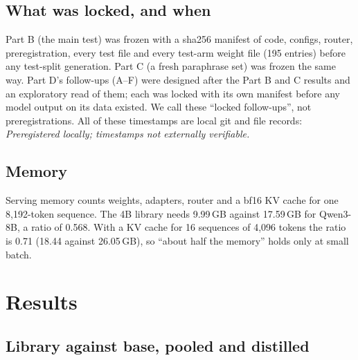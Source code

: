 \documentclass[11pt]{article}
\begin{document}
\subsection{What was locked, and when}
Part B (the main test) was frozen with a sha256 manifest of code, configs, router, preregistration, every test file
and every test-arm weight file (195 entries) before any test-split generation. Part C (a fresh paraphrase set) was
frozen the same way. Part D's follow-ups (A--F) were designed after the Part B and C results and an exploratory read
of them; each was locked with its own manifest before any model output on its data existed. We call these ``locked
follow-ups'', not preregistrations. All of these timestamps are local git and file records:
\emph{Preregistered locally; timestamps not externally verifiable.}

\subsection{Memory}
Serving memory counts weights, adapters, router and a bf16 KV cache for one 8,192-token sequence. The 4B library
needs 9.99\,GB against 17.59\,GB for Qwen3-8B, a ratio of 0.568. With a KV cache for 16 sequences of 4,096 tokens
the ratio is 0.71 (18.44 against 26.05\,GB), so ``about half the memory'' holds only at small batch.

\section{Results}

\subsection{Library against base, pooled and distilled}
\label{sec:libvs}
\end{document}
